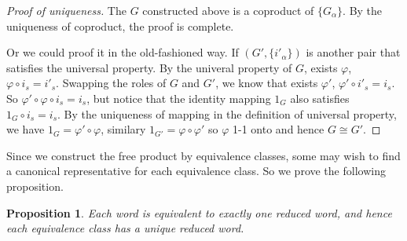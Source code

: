 \documentclass[a4paper]{article}
\theoremstyle{remark}
\theoremstyle{definition}
\theoremstyle{definition}
\theoremstyle{plain}
\newtheorem{proposition}{Proposition}
\begin{document}
  \begin{proof}[Proof of uniqueness]
    The $G$ constructed above is a coproduct of $\{G_\alpha\}$. By the uniqueness of coproduct, the proof is complete.

    Or we could proof it in the old-fashioned way. If $(G', \{i'_\alpha\})$ is another pair that satisfies
    the universal property. By the univeral property of $G$, exists $\varphi$, $\varphi \circ i_s = i'_s$.
    Swapping the roles of $G$ and $G'$, we know that exists $\varphi'$, $\varphi' \circ i'_s = i_s$.
    So $\varphi' \circ \varphi \circ i_s = i_s$, but notice that the identity mapping $1_G$ also
    satisfies $1_G \circ i_s = i_s$. By the uniqueness of mapping in the definition of
    universal property, we have $1_G = \varphi' \circ \varphi$, similary $1_{G'} = \varphi \circ \varphi'$
    so $\varphi$ 1-1 onto and hence $G \cong G'$.
  \end{proof}

  Since we construct the free product by equivalence classes, some may wish to find a canonical
  representative for each equivalence class. So we prove the following proposition.

  \begin{proposition}
    Each word is equivalent to exactly one reduced word, and hence each equivalence class
    has a unique reduced word.
  \end{proposition}
\end{document}

